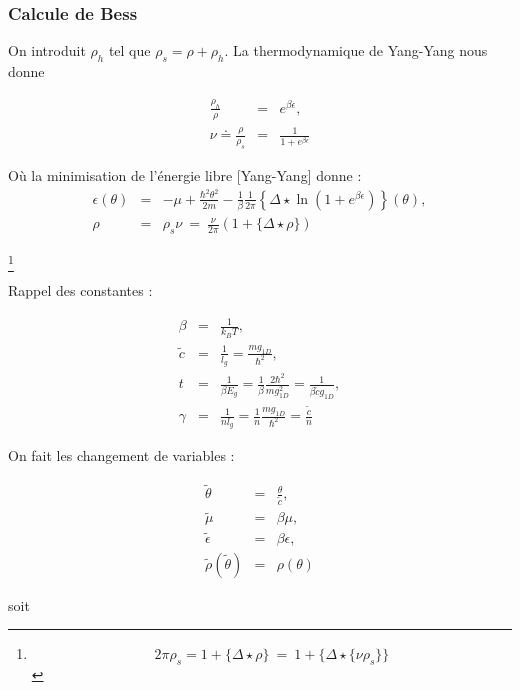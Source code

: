 	
	
\subsubsection{Calcule de Bess}

On introduit $\rho_h$ tel que $\rho_s = \rho + \rho_h$. La thermodynamique de Yang-Yang nous donne 

\begin{eqnarray}
	\frac{\rho_h}{\rho} & = & e^{\beta \epsilon }, \\
	\nu \doteq \frac{\rho}{\rho_s} & = & \frac{1}{1+ e ^{\beta \epsilon} }	
\end{eqnarray}

Où la minimisation de l'énergie libre [Yang-Yang] donne :
\begin{eqnarray}
	\epsilon ( \theta ) & = & - \mu + \frac{\hbar^2 \theta^2 }{2 m} - \frac{1}{ \beta } \frac{1}{2 \pi} \left \{\Delta \star \ln \left ( 1 + e^{\beta \epsilon} \right )  \right \} ( \theta ), \\
	\rho &=&  \rho_s \nu   ~=~   \frac{\nu}{2 \pi } ( 1 + \{ \Delta \star \rho \} ) 	
\end{eqnarray}

\footnote{$$ 	2\pi \rho_s  =  1 + \{ \Delta \star \rho \} ~= ~ 1 + \{ \Delta \star \{\nu \rho_s\} \} $$}

Rappel des constantes :

\begin{eqnarray*}
	\beta & = & \frac{1}{ k_B T} ,\\
	\tilde{c} & =& \frac{1}{l_g}  = \frac{ m g_{1D}}{\hbar^2},\\
	t & = & \frac{1}{\beta E_g} = \frac{1}{ \beta} \frac{2 \hbar^2 }	{ m g_{1D}^2 } = \frac{1}{ \beta  \tilde{c} g_{1D} },\\
	\gamma & = & \frac{1}{n l_g } = \frac{1}{n} \frac{ m g_{1D}}{\hbar^2} = \frac{\tilde{c}}{n} 
\end{eqnarray*}

On fait les changement de variables :

\begin{eqnarray*}
	\tilde{\theta} & = & \frac{\theta}{\tilde {c}},\\
	\tilde{\mu} & =& \beta \mu ,\\
	\tilde{\epsilon} & = & \beta \epsilon , \\
	\tilde{\rho}(\tilde{\theta}) & = & \rho ( \theta ) 	
\end{eqnarray*}

soit 

